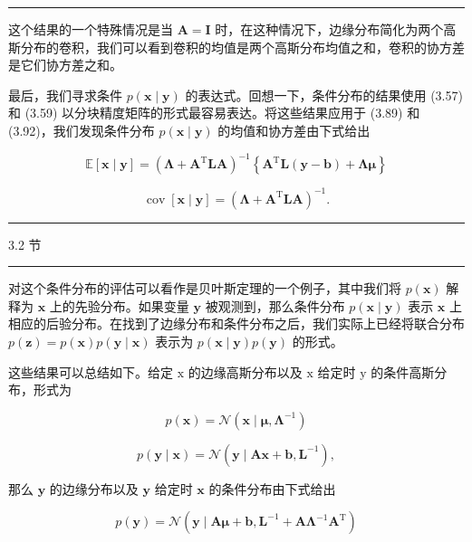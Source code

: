 \documentclass[10pt]{report}
\newcommand{\HRule}{\begin{center}\rule{0.9\linewidth}{0.2mm}\end{center}}
\begin{document}
\HRule

这个结果的一个特殊情况是当 \(\mathbf{A} = \mathbf{I}\) 时，在这种情况下，边缘分布简化为两个高斯分布的卷积，我们可以看到卷积的均值是两个高斯分布均值之和，卷积的协方差是它们协方差之和。

最后，我们寻求条件 \(p\left( {\mathbf{x} \mid  \mathbf{y}}\right)\) 的表达式。回想一下，条件分布的结果使用 (3.57) 和 (3.59) 以分块精度矩阵的形式最容易表达。将这些结果应用于 (3.89) 和 (3.92)，我们发现条件分布 \(p\left( {\mathbf{x} \mid  \mathbf{y}}\right)\) 的均值和协方差由下式给出

\[
\mathbb{E}\left\lbrack  {\mathbf{x} \mid  \mathbf{y}}\right\rbrack   = {\left( \mathbf{\Lambda } + {\mathbf{A}}^{\mathrm{T}}\mathbf{{LA}}\right) }^{-1}\left\{  {{\mathbf{A}}^{\mathrm{T}}\mathbf{L}\left( {\mathbf{y} - \mathbf{b}}\right)  + \mathbf{\Lambda }\mathbf{\mu }}\right\}   \tag{3.95}
\]

\[
\operatorname{cov}\left\lbrack  {\mathbf{x} \mid  \mathbf{y}}\right\rbrack   = {\left( \mathbf{\Lambda } + {\mathbf{A}}^{\mathrm{T}}\mathbf{L}\mathbf{A}\right) }^{-1}. \tag{3.96}
\]

\HRule

3.2 节

\HRule

对这个条件分布的评估可以看作是贝叶斯定理的一个例子，其中我们将 \(p\left( \mathbf{x}\right)\) 解释为 \(\mathbf{x}\) 上的先验分布。如果变量 \(\mathbf{y}\) 被观测到，那么条件分布 \(p\left( {\mathbf{x} \mid  \mathbf{y}}\right)\) 表示 \(\mathbf{x}\) 上相应的后验分布。在找到了边缘分布和条件分布之后，我们实际上已经将联合分布 \(p\left( \mathbf{z}\right)  = p\left( \mathbf{x}\right) p\left( {\mathbf{y} \mid  \mathbf{x}}\right)\) 表示为 \(p\left( {\mathbf{x} \mid  \mathbf{y}}\right) p\left( \mathbf{y}\right)\) 的形式。

这些结果可以总结如下。给定 \(\mathrm{x}\) 的边缘高斯分布以及 \(\mathrm{x}\) 给定时 \(\mathrm{y}\) 的条件高斯分布，形式为

\[
p\left( \mathbf{x}\right)  = \mathcal{N}\left( {\mathbf{x} \mid  \mathbf{\mu },{\mathbf{\Lambda }}^{-1}}\right)  \tag{3.97}
\]

\[
p\left( {\mathbf{y} \mid  \mathbf{x}}\right)  = \mathcal{N}\left( {\mathbf{y} \mid  \mathbf{A}\mathbf{x} + \mathbf{b},{\mathbf{L}}^{-1}}\right) , \tag{3.98}
\]

那么 \(\mathbf{y}\) 的边缘分布以及 \(\mathbf{y}\) 给定时 \(\mathbf{x}\) 的条件分布由下式给出

\[
p\left( \mathbf{y}\right)  = \mathcal{N}\left( {\mathbf{y} \mid  \mathbf{{A\mu }} + \mathbf{b},{\mathbf{L}}^{-1} + {\mathbf{{A\Lambda }}}^{-1}{\mathbf{A}}^{\mathrm{T}}}\right)  \tag{3.99}
\]
\end{document}
